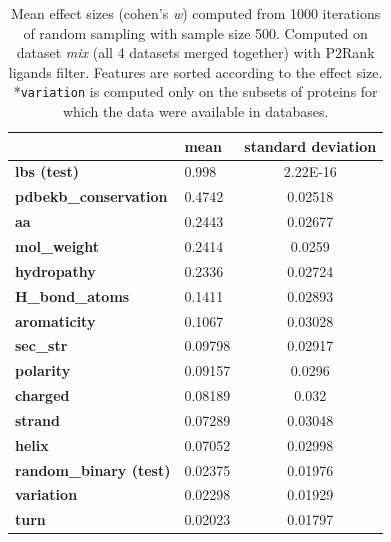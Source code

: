 \begin{table}[!h]
\centering
\begin{tabular}{@{}llc@{}}
\toprule
                              & \textbf{mean} & \textbf{standard deviation} \\ \midrule
\textbf{lbs (test)}                  & 0.998         & 2.22E-16                    \\
\textbf{pdbekb\_conservation} & 0.4742        & 0.02518                     \\
\textbf{aa}                   & 0.2443        & 0.02677                     \\
\textbf{mol\_weight}          & 0.2414        & 0.0259                      \\
\textbf{hydropathy}           & 0.2336        & 0.02724                     \\
\textbf{H\_bond\_atoms}       & 0.1411        & 0.02893                     \\
\textbf{aromaticity}          & 0.1067        & 0.03028                     \\
\textbf{sec\_str}             & 0.09798       & 0.02917                     \\
\textbf{polarity}             & 0.09157       & 0.0296                      \\
\textbf{charged}              & 0.08189       & 0.032                       \\
\textbf{strand}               & 0.07289       & 0.03048                     \\
\textbf{helix}                & 0.07052       & 0.02998                     \\
\textbf{random\_binary (test)}       & 0.02375       & 0.01976                     \\
\textbf{variation}            & 0.02298       & 0.01929                     \\
\textbf{turn}                 & 0.02023       & 0.01797                     \\ \bottomrule
\end{tabular}
\caption[Mean effect sizes (cohen's \textit{w})]{Mean effect sizes (cohen's \textit{w}) computed from 1000 iterations of random sampling with sample size 500. Computed on dataset \textit{mix} (all 4 datasets merged together) with P2Rank ligands filter. Features are sorted according to the effect size.
\hspace{\textwidth}
*\texttt{variation} is computed only on the subsets of proteins for which the data were available in databases.}
\label{tab:cohensw500}
\end{table}

